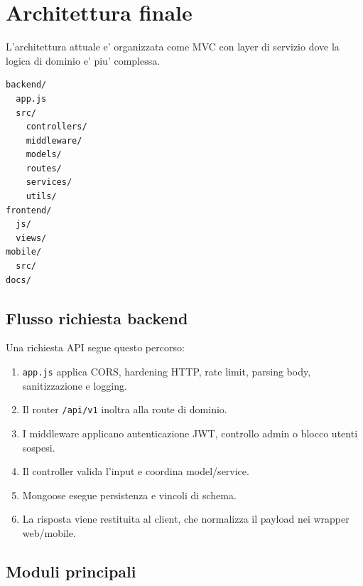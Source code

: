 \documentclass[11pt,a4paper]{article}
\begin{document}
\section{Architettura finale}

L'architettura attuale e' organizzata come MVC con layer di servizio dove la logica di dominio e' piu' complessa.

\begin{verbatim}
backend/
  app.js
  src/
    controllers/
    middleware/
    models/
    routes/
    services/
    utils/
frontend/
  js/
  views/
mobile/
  src/
docs/
\end{verbatim}

\subsection*{Flusso richiesta backend}

Una richiesta API segue questo percorso:

\begin{enumerate}
  \item \texttt{app.js} applica CORS, hardening HTTP, rate limit, parsing body, sanitizzazione e logging.
  \item Il router \texttt{/api/v1} inoltra alla route di dominio.
  \item I middleware applicano autenticazione JWT, controllo admin o blocco utenti sospesi.
  \item Il controller valida l'input e coordina model/service.
  \item Mongoose esegue persistenza e vincoli di schema.
  \item La risposta viene restituita al client, che normalizza il payload nei wrapper web/mobile.
\end{enumerate}

\subsection*{Moduli principali}
\end{document}
